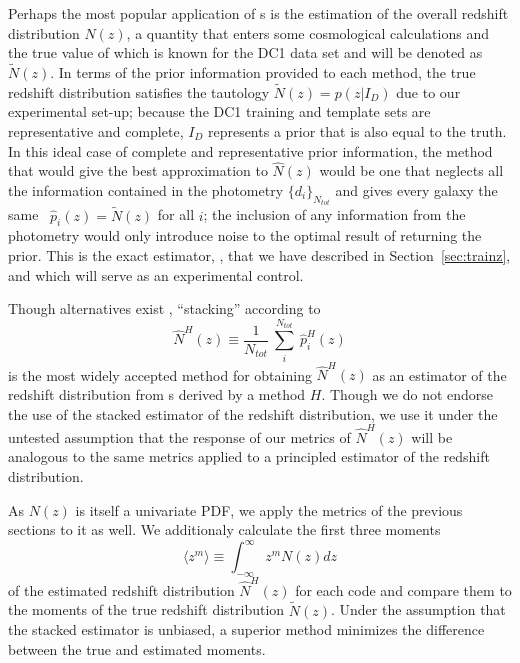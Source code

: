 Perhaps the most popular application of \pzpdf s is the estimation of the overall redshift distribution $N(z)$, a quantity that enters some cosmological calculations and the true value of which is known for the DC1 data set and will be denoted as $\tilde{N}(z)$.
In terms of the prior information provided to each method, the true redshift distribution satisfies the tautology $\tilde{N}(z) = p(z \vert I_{D})$ due to our experimental set-up; because the DC1 training and template sets are representative and complete, $I_{D}$ represents a prior that is also equal to the truth.
In this ideal case of complete and representative prior information, the method that would give the best approximation to $\hat{N}(z)$ would be one that neglects all the information contained in the photometry $\{d_{i}\}_{N_{tot}}$ and gives every galaxy the same \pzpdf\ $\hat{p}_{i}(z) = \tilde{N}(z)$ for all $i$; the inclusion of any information from the photometry would only introduce noise to the optimal result of returning the prior.
This is the exact estimator, \trainz, that we have described in Section~\ref{sec:trainz}, and which will serve as an experimental control.

Though alternatives exist \citep{Malz:chippr}, ``stacking'' according to
\begin{equation}
  \label{eq:stacked}
  \hat{N}^{H}(z) \equiv \frac{1}{N_{tot}}\ \sum_{i}^{N_{tot}}\ \hat{p}^{H}_{i}(z)
\end{equation}
is the most widely accepted method for obtaining $\hat{N}^{H}(z)$ as an estimator of the redshift distribution from \pzpdf s derived by a method $H$.
Though we do not endorse the use of the stacked estimator of the redshift distribution, we use it under the untested assumption that the response of our metrics of $\hat{N}^{H}(z)$ will be analogous to the same metrics applied to a principled estimator of the redshift distribution.

As $N(z)$ is itself a univariate PDF, we apply the metrics of the previous sections to it as well.
We additionaly calculate the first three moments
\begin{equation}
  \label{eq:moment}
  \langle z^{m}\rangle \equiv \int_{-\infty}^{\infty} z^{m} N(z) dz
\end{equation}
of the estimated redshift distribution $\hat{N}^{H}(z)$ for each code and compare them to the moments of the true redshift distribution $\tilde{N}(z)$.
Under the assumption that the stacked estimator is unbiased, a superior method minimizes the difference between the true and estimated moments.
